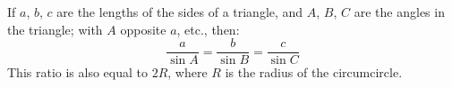 If $a$, $b$, $c$ are the lengths of the sides of a triangle, and $A$,
$B$, $C$ are the angles in the triangle; with $A$ opposite $a$, etc., then:
\[ 
\frac{a}{\sin A} = 
\frac{b}{\sin B} =
\frac{c}{\sin C} \]
This ratio is also equal to $2R$, where $R$ is the radius 
of the circumcircle.